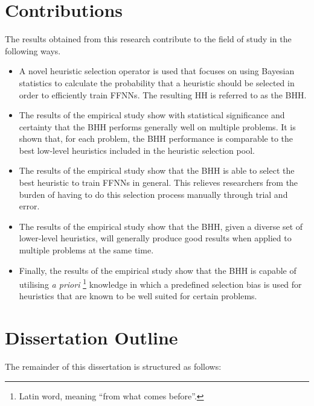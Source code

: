 \section{Contributions}\label{sec:introduction:contributions}

The results obtained from this research contribute to the field of study in the
following ways.

\begin{itemize}
      \item A novel heuristic selection operator is used that focuses on using Bayesian statistics to calculate the probability that a heuristic should be selected in order to efficiently train \acp{FFNN}. The resulting \acs{HH} is referred to as the \acf{BHH}.

      \item The results of the empirical study show with statistical significance and certainty that the \Acs{BHH} performs generally well on multiple problems. It is shown that, for each problem, the \Acs{BHH} performance is comparable to the best low-level heuristics included in the heuristic selection pool.

      \item The results of the empirical study show that the \Acs{BHH} is able to select the best heuristic to train \acp{FFNN} in general. This relieves researchers from the burden of having to do this selection process manually through trial and error.

      \item The results of the empirical study show that the \Acs{BHH}, given a diverse set of lower-level heuristics, will generally produce good results when applied to multiple problems at the same time.

      \item Finally, the results of the empirical study show that the \Acs{BHH} is capable of utilising \textit{a priori} \footnote{Latin word, meaning ``from what comes before''.} knowledge in which a predefined selection bias is used for heuristics that are known to be well suited for certain problems.
\end{itemize}


\section{Dissertation Outline}\label{sec:introduction:outline}

The remainder of this dissertation is structured as follows:

